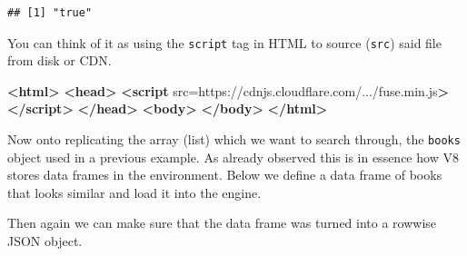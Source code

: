 \documentclass[
]{krantz}
\makeatletter
\newenvironment{Shaded}{\begin{snugshade}}{\end{snugshade}}
\newcommand{\DataTypeTok}[1]{\textcolor[rgb]{0.27,0.27,0.27}{#1}}
\newcommand{\KeywordTok}[1]{\textcolor[rgb]{0.27,0.27,0.27}{\textbf{#1}}}
\newcommand{\NormalTok}[1]{#1}
\newcommand{\OperatorTok}[1]{\textcolor[rgb]{0.43,0.43,0.43}{\textbf{#1}}}
\newcommand{\OtherTok}[1]{\textcolor[rgb]{0.37,0.37,0.37}{#1}}
\newcommand{\StringTok}[1]{\textcolor[rgb]{0.5,0.5,0.5}{#1}}
\newenvironment{kframe}{%
\medskip{}
\setlength{\fboxsep}{.8em}
 \def\at@end@of@kframe{}%
 \ifinner\ifhmode%
  \def\at@end@of@kframe{\end{minipage}}%
  \begin{minipage}{\columnwidth}%
 \fi\fi%
 \def\FrameCommand##1{\hskip\@totalleftmargin \hskip-\fboxsep
 \colorbox{shadecolor}{##1}\hskip-\fboxsep
     \hskip-\linewidth \hskip-\@totalleftmargin \hskip\columnwidth}%
 \MakeFramed {\advance\hsize-\width
   \@totalleftmargin\z@ \linewidth\hsize
   \@setminipage}}%
 {\par\unskip\endMakeFramed%
 \at@end@of@kframe}
\renewenvironment{Shaded}{\begin{kframe}}{\end{kframe}}
\makeatother
\begin{document}
\begin{verbatim}
## [1] "true"
\end{verbatim}

You can think of it as using the \texttt{script} tag in HTML to source (\texttt{src}) said file from disk or CDN.

\begin{Shaded}
\begin{Highlighting}[]
\KeywordTok{<html>}
  \KeywordTok{<head>}
    \KeywordTok{<script} 
\OtherTok{      src=}\StringTok{\textquotesingle{}https://cdnjs.cloudflare.com/.../fuse.min.js\textquotesingle{}}\KeywordTok{>}
    \KeywordTok{</script>}
  \KeywordTok{</head>}
  \KeywordTok{<body>}
  \KeywordTok{</body>}
\KeywordTok{</html>}
\end{Highlighting}
\end{Shaded}

Now onto replicating the array (list) which we want to search through, the \texttt{books} object used in a previous example. As already observed this is in essence how V8 stores data frames in the environment. Below we define a data frame of books that looks similar and load it into the engine.

\begin{Shaded}
\end{Shaded}

Then again we can make sure that the data frame was turned into a rowwise JSON object.

\begin{Shaded}
\end{Shaded}
\end{document}
